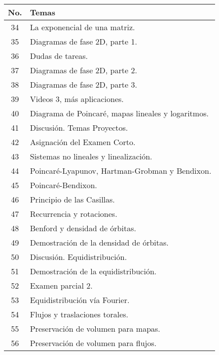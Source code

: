 \begin{table}[H]
	\centering
	\begin{tabular}{||c|p{13cm}||}
		\hline
		\hline
			No. & Temas \\
		\hline
		\hline
			34 & La exponencial de una matriz. \\
			35 & Diagramas de fase 2D, parte 1. \\
			36 & Dudas de tareas. \\
			37 & Diagramas de fase 2D, parte 2. \\
			38 & Diagramas de fase 2D, parte 3. \\
			39 & Videos 3, más aplicaciones. \\
			40 & Diagrama de Poincaré, mapas lineales y logaritmos. \\
			41 & Discusión. Temas Proyectos. \\
			42 & Asignación del Examen Corto. \\
			43 & Sistemas no lineales y linealización. \\
			44 & Poincaré-Lyapunov, Hartman-Grobman y Bendixon. \\
			45 & Poincaré-Bendixon. \\
			46 & Principio de las Casillas. \\
			47 & Recurrencia y rotaciones. \\
			48 & Benford y densidad de órbitas. \\
			49 & Demostración de la densidad de órbitas. \\
			50 & Discusión. Equidistribución. \\
			51 & Demostración de la equidistribución. \\
			52 & Examen parcial 2. \\
			53 & Equidistribución vía Fourier. \\ 
			54 & Flujos y traslaciones torales. \\
			55 & Preservación de volumen para mapas. \\
			56 & Preservación de volumen para flujos. \\
		\hline
		\hline
	\end{tabular}
\end{table}





